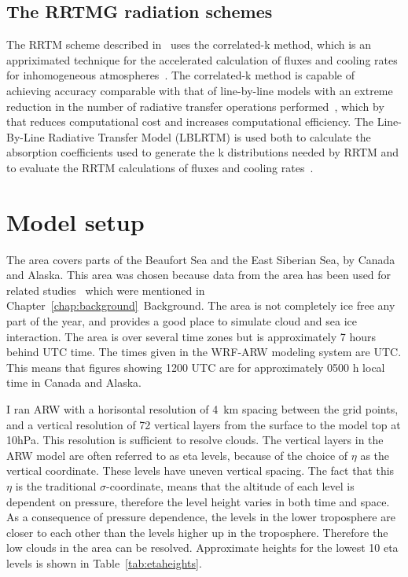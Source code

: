 \subsection{The RRTMG radiation schemes}
The RRTM scheme described in~\citet{Mlawer1997} uses the correlated-k method, which is an appriximated technique for the accelerated calculation of fluxes and cooling rates for inhomogeneous atmospheres~\citep{Mlawer1997}. %
The correlated-k method is capable of achieving accuracy comparable with that of line-by-line models with an extreme reduction in the number of radiative transfer operations performed~\citep{Mlawer1997}, which by that reduces computational cost and increases computational efficiency. The Line-By-Line Radiative Transfer Model (LBLRTM) is used both to calculate the absorption coefficients used to generate the k distributions needed by RRTM and  to evaluate the RRTM calculations of fluxes and cooling rates~\citep{Iacono2000}. 


\section{Model setup}
\label{sec:modelsetup}
The area covers parts of the Beaufort Sea and the East Siberian Sea, by Canada and Alaska. This area was chosen because data from the area has been used for related studies~\citep{Intrieri2002,Shupe2004,Kay2009,Wu2012,Palm2010,Schweiger2008} %
which were mentioned in Chapter~\ref{chap:background}~Background.%
The area is not completely ice free any part of the year,%
 and provides a good place to simulate cloud and sea ice interaction. The area is over several time zones but is approximately 7 hours behind UTC time. The times given in the WRF-ARW modeling system are UTC. This means that figures showing 1200 UTC are for approximately 0500 h local time in Canada and Alaska.

I ran ARW with a horisontal resolution of 4~km spacing between the grid points, and a vertical resolution of 72 vertical layers from the surface to the model top at 10hPa. This resolution is sufficient to resolve clouds.%
The vertical layers in the ARW model are often referred to as eta levels, because of the choice of $\eta$ as the vertical coordinate. These levels have uneven vertical spacing. The fact that this $\eta$ is the traditional $\sigma$-coordinate, means that the altitude of each level is dependent on pressure, therefore the level height varies in both time and space. As a consequence of pressure dependence, the levels in the lower troposphere are closer to each other than the levels higher up in the troposphere. Therefore the low clouds in the area can be resolved. Approximate heights for the lowest 10 eta levels is shown in Table~\ref{tab:etaheights}.

